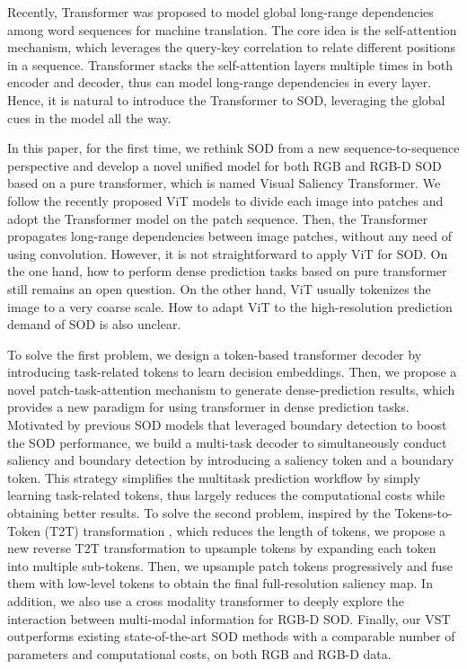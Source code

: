 \documentclass[10pt,twocolumn,letterpaper]{article}
\begin{document}
Recently, Transformer \cite{vaswani2017attention} was proposed to model global long-range dependencies among word sequences for machine translation. The core idea is the self-attention mechanism, which leverages the query-key correlation to relate different positions in a sequence. Transformer stacks the self-attention layers multiple times in both encoder and decoder, thus can model long-range dependencies in every layer.
Hence, it is natural to introduce the Transformer to SOD, leveraging the global cues in the model all the way.

In this paper, for the first time, we rethink SOD from a new sequence-to-sequence perspective and develop a novel unified model for both RGB and RGB-D SOD based on a pure transformer, which is named Visual Saliency Transformer.
We follow the recently proposed ViT models \cite{dosovitskiy2020image,yuan2021tokens} to divide each image into patches and adopt the Transformer model on the patch sequence. Then, the Transformer propagates long-range dependencies between image patches, without any need of using convolution.
However, it is not straightforward to apply ViT for SOD. On the one hand, how to perform dense prediction tasks based on pure transformer still remains an open question. On the other hand, ViT usually tokenizes the image to a very coarse scale. How to adapt ViT to the high-resolution prediction demand of SOD is also unclear.

To solve the first problem, we design a token-based transformer decoder by introducing task-related tokens to learn decision embeddings. Then, we propose a novel patch-task-attention mechanism to generate dense-prediction results, which provides a new paradigm for using transformer in dense prediction tasks. Motivated by previous SOD models \cite{zhao2019EGNet,Zhou2020ITSD,zhang2020select,Wei2020CoNet} that leveraged boundary detection to boost the SOD performance, we build a multi-task decoder to simultaneously conduct saliency and boundary detection by introducing a saliency token and a boundary token. This strategy simplifies the multitask prediction workflow by simply learning task-related tokens, thus largely reduces the computational costs while obtaining better results. To solve the second problem, inspired by the Tokens-to-Token (T2T) transformation \cite{yuan2021tokens}, which reduces the length of tokens, we propose a new reverse T2T transformation to upsample tokens by expanding each token into multiple sub-tokens. Then, we upsample patch tokens progressively and fuse them with low-level tokens to obtain the final full-resolution saliency map.
In addition,
we also use a cross modality transformer to deeply explore the interaction between multi-modal information for RGB-D SOD. Finally, our VST outperforms existing state-of-the-art SOD methods with a comparable number of parameters and computational costs, on both RGB and RGB-D data.
\end{document}
